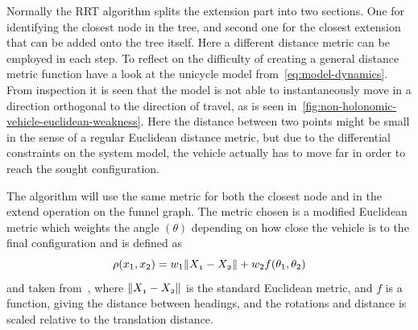 Normally the \ac{RRT} algorithm splits the extension part into two sections. One
for identifying the closest node in the tree, and second one for the closest
extension that can be added onto the tree itself. Here a different distance
metric can be employed in each step. To reflect on the difficulty of creating a
general distance metric function have a look at the unicycle model
from~\cref{eq:model-dynamics}. From inspection it is seen that the model is not
able to instantaneously move in a direction orthogonal to the direction of
travel, as is seen in~\cref{fig:non-holonomic-vehicle-euclidean-weakness}. Here
the distance between two points might be small in the sense of a regular
Euclidean distance metric, but due to the differential constraints on the system
model, the vehicle actually has to move far in order to reach the sought
configuration.

The \rrtfunnel{} algorithm will use the same metric for both the closest node
and in the extend operation on the funnel graph. The metric chosen is a modified
Euclidean metric which weights the angle \((\theta)\) depending on how close the
vehicle is to the final configuration and is defined as
\[
  \rho(x_{1},x_{2}) = w_{1}\lVert\mathnormal{X_{1}} - \mathnormal{X_{2}}\rVert +
  w_{2}f(\theta_1,\theta_2)
\]
and taken from~\cite{kuffnerEffectiveSamplingDistance2004}, where
\(\lVert\mathnormal{X_{1}} - \mathnormal{X_{2}}\rVert\) is the standard Euclidean
metric, and \(f\) is a function, giving the distance between headings, and the
rotations and distance is scaled relative to the translation distance.

